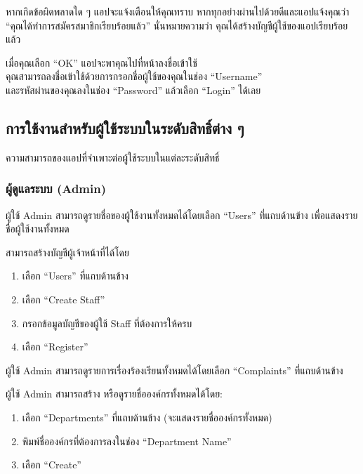 หากเกิดข้อผิดพลาดใด ๆ แอปจะแจ้งเตือนให้คุณทราบ
หากทุกอย่างผ่านไปด้วยดีและแอปแจ้งคุณว่า ``คุณได้ทำการสมัครสมาชิกเรียบร้อยแล้ว'' นั่นหมายความว่า คุณได้สร้างบัญชีผู้ใช้ของแอปเรียบร้อยแล้ว

เมื่อคุณเลือก ``OK'' แอปจะพาคุณไปที่หน้าลงชื่อเข้าใช้\\
คุณสามารถลงชื่อเข้าใช้ด้วยการกรอกชื่อผู้ใช้ของคุณในช่อง ``Username''\\
และรหัสผ่านของคุณลงในช่อง ``Password'' แล้วเลือก ``Login'' ได้เลย

\pagebreak[4]

\subsection{การใช้งานสำหรับผู้ใช้ระบบในระดับสิทธิ์ต่าง ๆ}\label{subsec:role-specific-usage}

ความสามารถของแอปที่จำเพาะต่อผู้ใช้ระบบในแต่ละระดับสิทธิ์

\subsubsection{ผู้ดูแลระบบ (Admin)}\label{subsubsec:role-usage-admin}

ผู้ใช้ Admin สามารถดูรายชื่อของผู้ใช้งานทั้งหมดได้โดยเลือก ``Users'' ที่แถบด้านข้าง
เพื่อแสดงรายชื่อผู้ใช้งานทั้งหมด


สามารถสร้างบัญชีผู้เจ้าหน้าที่ได้โดย

\begin{enumerate}
    \item เลือก ``Users'' ที่แถบด้านข้าง
    \item เลือก ``Create Staff''
    \item กรอกข้อมูลบัญชีของผู้ใช้ Staff ที่ต้องการให้ครบ
    \item เลือก ``Register''
\end{enumerate}


ผู้ใช้ Admin สามารถดูรายการเรื่องร้องเรียนทั้งหมดได้โดยเลือก ``Complaints'' ที่แถบด้านข้าง


ผู้ใช้ Admin สามารถสร้าง หรือดูรายชื่อองค์กรทั้งหมดได้โดย:

\begin{enumerate}
    \item เลือก ``Departments'' ที่แถบด้านข้าง (จะแสดงรายชื่อองค์กรทั้งหมด)
    \item พิมพ์ชื่อองค์กรที่ต้องการลงในช่อง ``Department Name''
    \item เลือก ``Create''
\end{enumerate}

